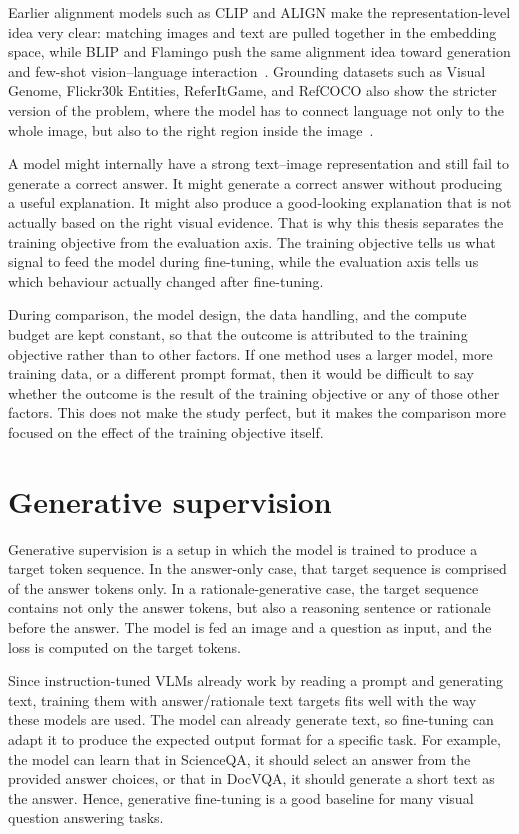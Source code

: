 Earlier alignment models such as CLIP and ALIGN make the representation-level idea very clear:
matching images and text are pulled together in the embedding space,
while BLIP and Flamingo push the same alignment idea toward generation and few-shot vision--language interaction~\cite{radford2021clip,jia2021align,li2022blip,alayrac2022flamingo}.
Grounding datasets such as Visual Genome, Flickr30k Entities, ReferItGame, and RefCOCO also show the stricter version of the problem,
where the model has to connect language not only to the whole image, but also to the right region inside the image~\cite{krishna2017visualgenome,plummer2015flickr30k,kazemzadeh2014referitgame,yu2016modelingvisual}.

A model might internally have a strong text--image representation and still fail to generate a correct answer.
It might generate a correct answer without producing a useful explanation.
It might also produce a good-looking explanation that is not actually based on the right visual evidence.
That is why this thesis separates the training objective from the evaluation axis.
The training objective tells us what signal to feed the model during fine-tuning,
while the evaluation axis tells us which behaviour actually changed after fine-tuning. 

During comparison, the model design, the data handling, and the compute budget are kept constant, so that the outcome is attributed to the training objective rather than to other factors.
If one method uses a larger model, more training data, or a different prompt format, then it would be difficult to say whether the outcome is the result of the training objective or any of those other factors.
This does not make the study perfect, but it makes the comparison more focused on the effect of the training objective itself.


\section{Generative supervision}
Generative supervision is a setup in which the model is trained to produce a target token sequence.
In the answer-only case, that target sequence is comprised of the answer tokens only.
In a rationale-generative case, the target sequence contains not only the answer tokens, but also a reasoning sentence or rationale before the answer.
The model is fed an image and a question as input, and the loss is computed on the target tokens.

Since instruction-tuned VLMs already work by reading a prompt and generating text,
training them with answer/rationale text targets fits well with the way these models are used.
The model can already generate text, so fine-tuning can adapt it to produce the expected output format for a specific task.
For example, the model can learn that in ScienceQA, it should select an answer from the provided answer choices,
or that in DocVQA, it should generate a short text as the answer.
Hence, generative fine-tuning is a good baseline for many visual question answering tasks.

